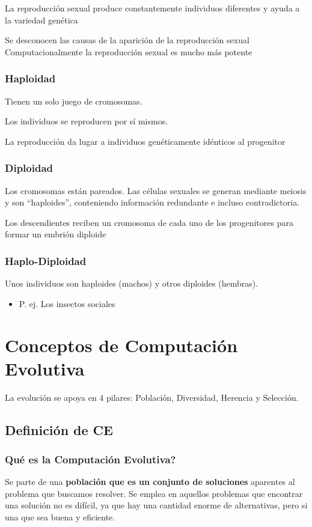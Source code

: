 \documentclass[12pt, twoside, openright]{report} %
\begin{document}
La reproducción sexual produce constantemente individuos diferentes y ayuda a la variedad genética

Se desconocen las causas de la aparición de la reproducción sexual Computacionalmente la reproducción sexual es mucho más potente

\subsubsection{Haploidad}
Tienen un solo juego de cromosomas.

Los individuos se reproducen por sí mismos.

La reproducción da lugar a individuos genéticamente idénticos al progenitor

\subsubsection{Diploidad}
Los cromosomas están pareados. Las células sexuales se generan mediante meiosis y son “haploides”, conteniendo información redundante e incluso contradictoria.

Los descendientes reciben un cromosoma de cada uno de los progenitores para formar un embrión diploide

\subsubsection{Haplo-Diploidad}
Unos individuos son haploides (machos) y otros diploides (hembras).
\begin{itemize}
	\item P. ej. Los insectos sociales
\end{itemize}
\pagebreak

\section{Conceptos de Computación Evolutiva}
La evolución se apoya en 4 pilares: Población, Diversidad, Herencia y Selección.
\subsection{Definición de CE}
\subsubsection{Qué es la Computación Evolutiva?}
Se parte de una \textbf{población que es un conjunto de soluciones} aparentes al problema que buscamos resolver. Se emplea en aquellos problemas que encontrar una solución no es difícil, ya que hay una cantidad enorme de alternativas, pero si una que sea buena y eficiente.
\end{document}
